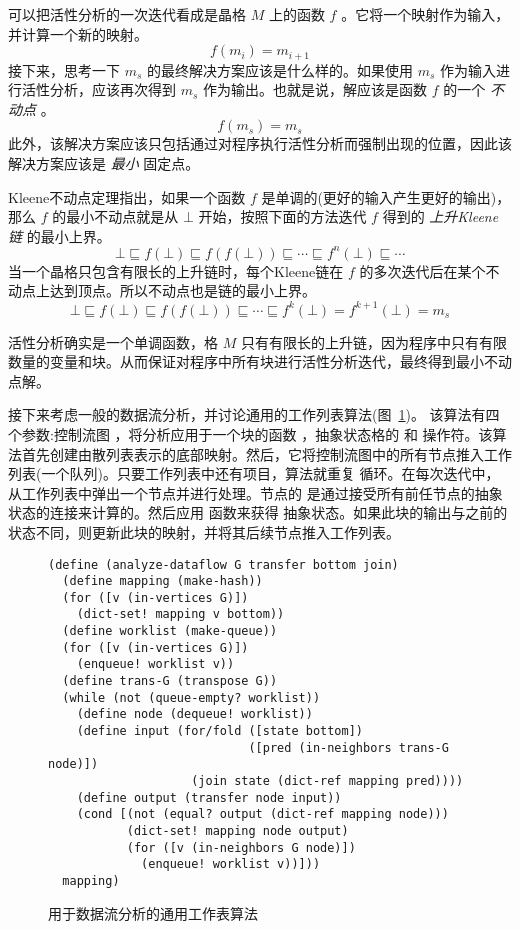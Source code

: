\documentclass[11pt]{book}
\begin{document}
可以把活性分析的一次迭代看成是晶格 $M$ 上的函数 $f$ 。它将一个映射作为输入，并计算一个新的映射。
\[
   f(m_i) = m_{i+1}
\]
接下来，思考一下 $m_s$
的最终解决方案应该是什么样的。如果使用
$m_s$ 作为输入进行活性分析，应该再次得到 $m_s$ 作为输出。也就是说，解应该是函数 $f$ 的一个 \emph{不动点} 。
\[
   f(m_s) = m_s
\]
此外，该解决方案应该只包括通过对程序执行活性分析而强制出现的位置，因此该解决方案应该是 \emph{最小} 固定点。

Kleene不动点定理指出，如果一个函数 $f$ 是单调的(更好的输入产生更好的输出)，那么 $f$ 的最小不动点就是从 $\bot$ 开始，按照下面的方法迭代 $f$ 得到的 \emph{上升Kleene链} 的最小上界。
\[
\bot \sqsubseteq f(\bot) \sqsubseteq f(f(\bot)) \sqsubseteq \cdots
  \sqsubseteq f^n(\bot) \sqsubseteq \cdots
\]
当一个晶格只包含有限长的上升链时，每个Kleene链在 $f$ 的多次迭代后在某个不动点上达到顶点。所以不动点也是链的最小上界。
\[
\bot \sqsubseteq f(\bot) \sqsubseteq f(f(\bot)) \sqsubseteq \cdots
\sqsubseteq f^k(\bot) = f^{k+1}(\bot) = m_s
\]

活性分析确实是一个单调函数，格
$M$ 只有有限长的上升链，因为程序中只有有限数量的变量和块。从而保证对程序中所有块进行活性分析迭代，最终得到最小不动点解。

接下来考虑一般的数据流分析，并讨论通用的工作列表算法(图~\ref{fig:generic-dataflow})。
%
该算法有四个参数:控制流图  ，将分析应用于一个块的函数  ，抽象状态格的
 和  操作符。该算法首先创建由散列表表示的底部映射。然后，它将控制流图中的所有节点推入工作列表(一个队列)。只要工作列表中还有项目，算法就重复  循环。在每次迭代中，从工作列表中弹出一个节点并进行处理。节点的
 是通过接受所有前任节点的抽象状态的连接来计算的。然后应用 
函数来获得  抽象状态。如果此块的输出与之前的状态不同，则更新此块的映射，并将其后续节点推入工作列表。

\begin{figure}[tb]
\begin{lstlisting}
(define (analyze-dataflow G transfer bottom join)
  (define mapping (make-hash))
  (for ([v (in-vertices G)])
    (dict-set! mapping v bottom))
  (define worklist (make-queue))
  (for ([v (in-vertices G)])
    (enqueue! worklist v))
  (define trans-G (transpose G))
  (while (not (queue-empty? worklist))
    (define node (dequeue! worklist)) 
    (define input (for/fold ([state bottom])
                            ([pred (in-neighbors trans-G node)])
                    (join state (dict-ref mapping pred))))
    (define output (transfer node input))
    (cond [(not (equal? output (dict-ref mapping node)))
           (dict-set! mapping node output)
           (for ([v (in-neighbors G node)])
             (enqueue! worklist v))]))
  mapping)
\end{lstlisting}
\caption{用于数据流分析的通用工作表算法}
  \label{fig:generic-dataflow}
\end{figure}
\end{document}

